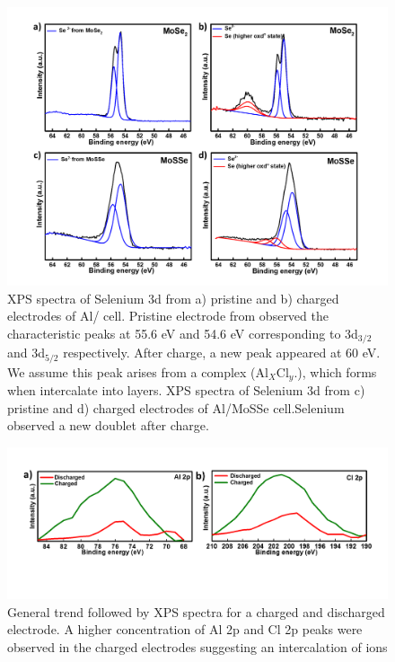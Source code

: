 \begin{figure}[htb!]
\centering
\includegraphics[width=\textwidth]{Figures/chap4fig/S4}
\caption{XPS spectra of Selenium 3d from a) pristine and b) charged electrodes of Al/ cell. Pristine electrode from  observed the characteristic peaks at 55.6 eV and 54.6 eV corresponding to 3d$_{3/2}$ and 3d$_{5/2}$ respectively. After charge, a new peak appeared at 60 eV. We assume this peak arises from a complex (Al$_X$Cl$_y$.), which forms when  intercalate into  layers. XPS spectra of Selenium 3d from c) pristine and d) charged electrodes of Al/MoSSe cell.Selenium observed a new doublet after charge.}
\label{Figures/chap4fig:S4}
\end{figure}
\begin{figure}[htb!]
\centering
\includegraphics[width=\textwidth]{Figures/chap4fig/S5}
\caption{General trend followed by  XPS spectra for a charged and discharged electrode. A higher concentration of Al 2p and Cl 2p peaks were observed in the charged electrodes suggesting an intercalation of  ions}
\label{Figures/chap4fig:S5}
\end{figure}
